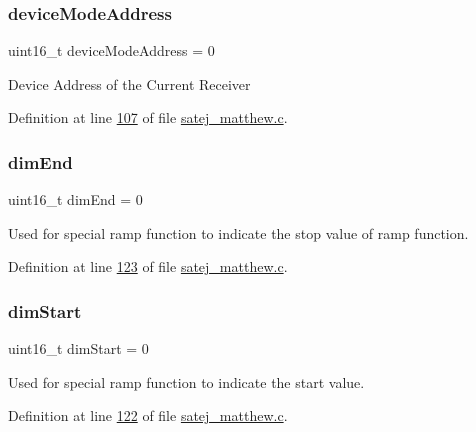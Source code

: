 \mbox{\label{satej__matthew_8c_aefd454f4f4d2d4dc52ea4a94145c0e93}} 
\subsubsection{\texorpdfstring{deviceModeAddress}{deviceModeAddress}}
{\footnotesize\ttfamily uint16\+\_\+t device\+Mode\+Address = 0}

Device Address of the Current Receiver 

Definition at line \mbox{\hyperlink{satej__matthew_8c_source_l00107}{107}} of file \mbox{\hyperlink{satej__matthew_8c_source}{satej\+\_\+matthew.\+c}}.

\mbox{\label{satej__matthew_8c_ac4542092d3e67f5fcb7f5ac24e6778c2}} 
\subsubsection{\texorpdfstring{dimEnd}{dimEnd}}
{\footnotesize\ttfamily uint16\+\_\+t dim\+End = 0}

Used for special ramp function to indicate the stop value of ramp function. 

Definition at line \mbox{\hyperlink{satej__matthew_8c_source_l00123}{123}} of file \mbox{\hyperlink{satej__matthew_8c_source}{satej\+\_\+matthew.\+c}}.

\mbox{\label{satej__matthew_8c_ad2e81110ac5d5101e2b8b67c4458bae3}} 
\subsubsection{\texorpdfstring{dimStart}{dimStart}}
{\footnotesize\ttfamily uint16\+\_\+t dim\+Start = 0}

Used for special ramp function to indicate the start value. 

Definition at line \mbox{\hyperlink{satej__matthew_8c_source_l00122}{122}} of file \mbox{\hyperlink{satej__matthew_8c_source}{satej\+\_\+matthew.\+c}}.

\mbox{\label{satej__matthew_8c_a2dfb3db6e969929dc4c426fc2a65cc69}} 
